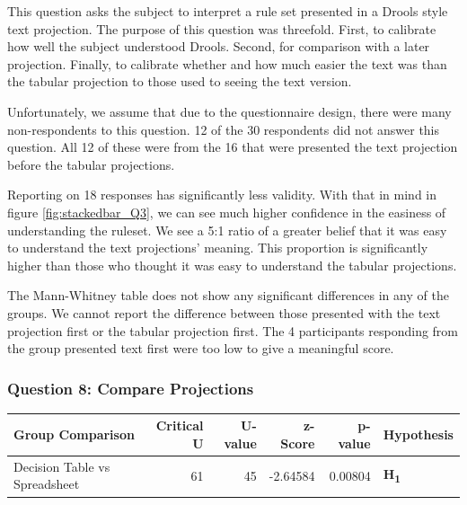 This question asks the subject to interpret a rule set presented in a Drools style text projection.
The purpose of this question was threefold.
First, to calibrate how well the subject understood Drools.
Second, for comparison with a later projection.
Finally, to calibrate whether and how much easier the text was than the tabular projection to those used to seeing the text version.

Unfortunately, we assume that due to the questionnaire design, there were many non-respondents to this question. 
12 of the 30 respondents did not answer this question.
All 12 of these were from the 16 that were presented the text projection before the tabular projections.

Reporting on 18 responses has significantly less validity.
With that in mind in figure \ref{fig:stackedbar_Q3}, we can see much higher confidence in the easiness of understanding the ruleset.
We see a 5:1 ratio of a greater belief that it was easy to understand the text projections' meaning.
This proportion is significantly higher than those who thought it was easy to understand the tabular projections.

The Mann-Whitney table does not show any significant differences in any of the groups.
We cannot report the difference between those presented with the text projection first or the tabular projection first.
The 4 participants responding from the group presented text first were too low to give a meaningful score.

\subsubsection{Question 8: Compare Projections}
\noindent\begin{minipage}{\linewidth}
    \centering
    \label{fig:stackedbar_Q4}
    
    \begin{tabular}{ |l ||r |r |r | r|l | } 
        \hline
        Group Comparison                 & Critical U & U-value & z-Score  & p-value & Hypothesis         \\
        \hline
        \hline
        Decision Table vs Spreadsheet    & 61         & 45      &  -2.64584& 0.00804 & \textbf{H\textsubscript{1}} \\ 
        \hline
    \end{tabular}
    \label{table:mannwhitneyQ4}
\end{minipage} 

